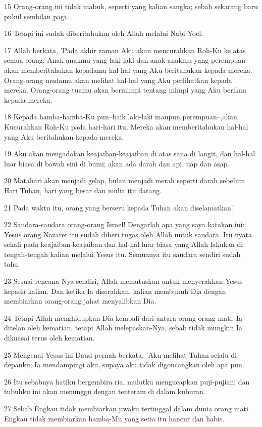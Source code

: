 \par 15 Orang-orang ini tidak mabuk, seperti yang kalian sangka; sebab sekarang baru pukul sembilan pagi.
\par 16 Tetapi ini sudah diberitahukan oleh Allah melalui Nabi Yoel:
\par 17 Allah berkata, 'Pada akhir zaman Aku akan mencurahkan Roh-Ku ke atas semua orang. Anak-anakmu yang laki-laki dan anak-anakmu yang perempuan akan memberitahukan kepadamu hal-hal yang Aku beritahukan kepada mereka. Orang-orang mudamu akan melihat hal-hal yang Aku perlihatkan kepada mereka. Orang-orang tuamu akan bermimpi tentang mimpi yang Aku berikan kepada mereka.
\par 18 Kepada hamba-hamba-Ku pun--baik laki-laki maupun perempuan--,akan Kucurahkan Roh-Ku pada hari-hari itu. Mereka akan memberitahukan hal-hal yang Aku beritahukan kepada mereka.
\par 19 Aku akan mengadakan keajaiban-keajaiban di atas sana di langit, dan hal-hal luar biasa di bawah sini di bumi; akan ada darah dan api, uap dan asap.
\par 20 Matahari akan menjadi gelap, bulan menjadi merah seperti darah sebelum Hari Tuhan, hari yang besar dan mulia itu datang.
\par 21 Pada waktu itu, orang yang berseru kepada Tuhan akan diselamatkan.'
\par 22 Saudara-saudara orang-orang Israel! Dengarlah apa yang saya katakan ini: Yesus orang Nazaret itu sudah diberi tugas oleh Allah untuk saudara. Itu nyata sekali pada keajaiban-keajaiban dan hal-hal luar biasa yang Allah lakukan di tengah-tengah kalian melalui Yesus itu. Semuanya itu saudara sendiri sudah tahu.
\par 23 Sesuai rencana-Nya sendiri, Allah memutuskan untuk menyerahkan Yesus kepada kalian. Dan ketika Ia diserahkan, kalian membunuh Dia dengan membiarkan orang-orang jahat menyalibkan Dia.
\par 24 Tetapi Allah menghidupkan Dia kembali dari antara orang-orang mati. Ia ditelan oleh kematian, tetapi Allah melepaskan-Nya, sebab tidak mungkin Ia dikuasai terus oleh kematian.
\par 25 Mengenai Yesus ini Daud pernah berkata, 'Aku melihat Tuhan selalu di depanku; Ia mendampingi aku, supaya aku tidak digoncangkan oleh apa pun.
\par 26 Itu sebabnya hatiku bergembira ria, mulutku mengucapkan puji-pujian: dan tubuhku ini akan menunggu dengan tenteram di dalam kuburan.
\par 27 Sebab Engkau tidak membiarkan jiwaku tertinggal dalam dunia orang mati. Engkau tidak membiarkan hamba-Mu yang setia itu hancur dan habis.
